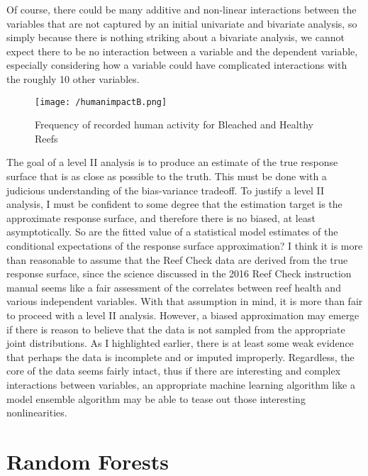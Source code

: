 \documentclass{article}
\begin{document}
Of course, there could be many additive and non-linear interactions between the variables that are not captured by an initial univariate and bivariate analysis, so simply because there is nothing striking about a bivariate analysis, we cannot expect there to be no interaction between a variable and the dependent variable, especially considering how a variable could have complicated interactions with the roughly 10 other variables. 
\begin{figure}[!htb]
    \centering
    \texttt{[image: /humanimpactB.png]}
    \caption{Frequency of recorded human activity for Bleached and Healthy Reefs}
    \label{humanimpactB}
\end{figure}

The goal of a level II analysis is to produce an estimate of the true response surface that is as close as possible to the truth. This must be done with a judicious understanding of the bias-variance tradeoff. To justify a level II analysis, I must be confident to some degree that the estimation target is the approximate response surface, and therefore there is no biased, at least asymptotically. So are the fitted value of a statistical model estimates of the conditional expectations of the response surface approximation? I think it is more than reasonable to assume that the Reef Check data are derived from the true response surface, since the science discussed in the 2016 Reef Check instruction manual seems like a fair assessment of the correlates between reef health and various independent variables. With that assumption in mind, it is more than fair to proceed with a level II analysis. However, a biased approximation may emerge if there is reason to believe that the data is not sampled from the appropriate joint distributions. As I highlighted earlier, there is at least some weak evidence that perhaps the data is incomplete and or imputed improperly. Regardless, the core of the data seems fairly intact, thus if there are interesting and complex interactions between variables, an appropriate machine learning algorithm like a model ensemble algorithm may be able to tease out those interesting nonlinearities. 

\newpage

\section{Random Forests}
\end{document}
